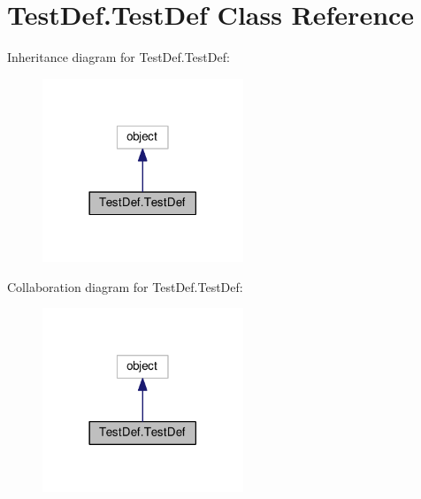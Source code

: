 \hypertarget{classTestDef_1_1TestDef}{\section{Test\-Def.\-Test\-Def Class Reference}
\label{classTestDef_1_1TestDef}
}


Inheritance diagram for Test\-Def.\-Test\-Def\-:
\nopagebreak
\begin{figure}[H]
\begin{center}
\leavevmode
\includegraphics[width=170pt]{classTestDef_1_1TestDef__inherit__graph}
\end{center}
\end{figure}


Collaboration diagram for Test\-Def.\-Test\-Def\-:
\nopagebreak
\begin{figure}[H]
\begin{center}
\leavevmode
\includegraphics[width=170pt]{classTestDef_1_1TestDef__coll__graph}
\end{center}
\end{figure}
